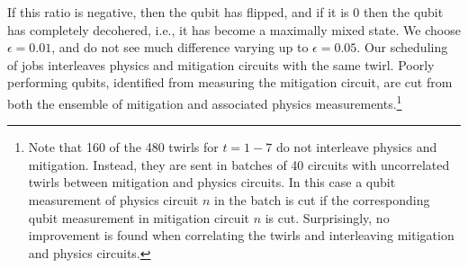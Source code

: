 \documentclass[aps, prc, tightenlines,superscriptaddress, letterpaper, amsmath, amssymb, preprintnumbers, floatfix, longbibliography, nofootinbib]{revtex4-2}
\begin{document}
If this ratio is negative, then the qubit has flipped, and if it is 0 then the qubit has completely decohered, i.e., it has become a maximally mixed state.
We choose $\epsilon = 0.01$, and do not see much difference varying up to $\epsilon = 0.05$.
Our scheduling of  jobs interleaves physics and mitigation circuits with the same twirl.
Poorly performing qubits, identified from measuring the mitigation circuit, are cut from both the ensemble of mitigation and associated physics measurements.\footnote{
Note that 160 of the 480 twirls for $t=1-7$ do not interleave physics and mitigation. Instead, they are sent in batches of 40 circuits with uncorrelated twirls between mitigation and physics circuits. 
In this case a qubit measurement of physics circuit $n$ in the batch is cut if the corresponding qubit measurement in mitigation circuit $n$ is cut.
Surprisingly, no improvement is found when correlating the twirls and interleaving mitigation and physics circuits.}
\end{document}
